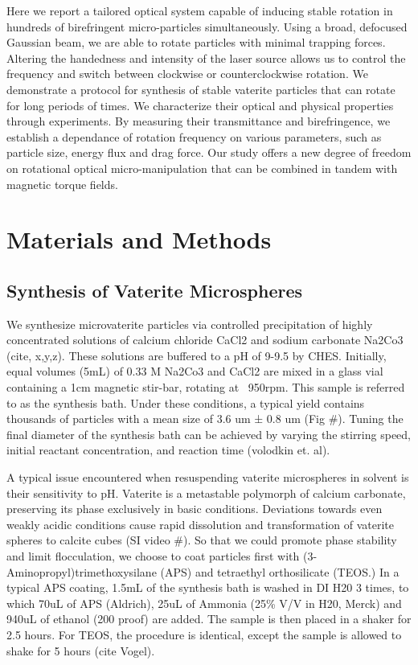 \documentclass[12pt]{article}
\begin{document}
Here we report a tailored optical system capable of inducing stable rotation in hundreds of birefringent micro-particles simultaneously. Using a broad, defocused Gaussian beam, we are able to rotate particles with minimal trapping forces. Altering the handedness and intensity of the laser source allows us to control the frequency and switch between clockwise or counterclockwise rotation. We demonstrate a protocol for synthesis of stable vaterite particles that can rotate for long periods of times. We characterize their optical and physical properties through experiments. By measuring their transmittance and birefringence, we establish a dependance of rotation frequency on various parameters, such as particle size, energy flux and drag force. Our study offers a new degree of freedom on rotational optical micro-manipulation that can be combined in tandem with magnetic torque fields.
 	



\section*{Materials and Methods}
\subsection*{Synthesis of Vaterite Microspheres}
\hspace{15pt}We synthesize microvaterite particles via controlled precipitation of highly concentrated solutions of calcium chloride CaCl2 and sodium carbonate Na2Co3 (cite, x,y,z). These solutions are buffered to a pH of 9-9.5 by CHES. Initially, equal volumes (5mL) of 0.33 M Na2Co3 and CaCl2 are mixed in a glass vial containing a 1cm magnetic stir-bar, rotating at ~950rpm. This sample is referred to as the synthesis bath. Under these conditions, a typical yield contains thousands of particles with a mean size of 3.6 um ± 0.8 um (Fig #). Tuning the final diameter of the synthesis bath can be achieved by varying the stirring speed, initial reactant concentration, and reaction time (volodkin et. al). 

A typical issue encountered when resuspending vaterite microspheres in solvent is their sensitivity to pH. Vaterite is a metastable polymorph of calcium carbonate, preserving its phase exclusively in basic conditions. Deviations towards even weakly acidic conditions cause rapid dissolution and transformation of vaterite spheres to calcite cubes (SI video #). So that we could promote phase stability and limit flocculation, we choose to coat particles first with (3- Aminopropyl)trimethoxysilane (APS) and tetraethyl orthosilicate (TEOS.) In a typical APS coating, 1.5mL of the synthesis bath is washed in DI H20 3 times, to which 70uL of APS (Aldrich), 25uL of Ammonia (25\% V/V in H20, Merck) and 940uL of ethanol (200 proof) are added. The sample is then placed in a shaker for 2.5 hours. For TEOS, the procedure is identical, except the sample is allowed to shake for 5 hours (cite Vogel). 
\end{document}
